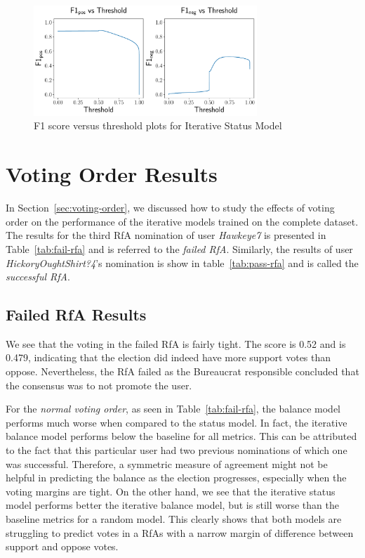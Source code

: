 \begin{figure}[htp]
    \centering
    \includegraphics[width=0.75\textwidth]{images/iterative_Status_f1.pdf}
    \caption{F1 score versus threshold plots for Iterative Status Model}
    \label{fig:complete-iterative-status-f1}
\end{figure}


\section{Voting Order Results}
\label{sec:voting-order-results}
In Section~\ref{sec:voting-order}, we discussed how to study the effects of voting order on the performance of the iterative models trained on the complete \wikirfa dataset.
The results for the third RfA nomination  of user \textit{Hawkeye7} is presented in Table~\ref{tab:fail-rfa} and is referred to the \textit{failed RfA}.
Similarly, the results of user \textit{HickoryOughtShirt?4}'s nomination is show in table~\ref{tab:pass-rfa} and is called the \textit{successful RfA}.

\subsection{Failed RfA Results}
We see that the voting in the failed RfA is fairly tight.
The \aucposPR score is 0.52 and \aucnegPR is 0.479, indicating that the election did indeed have more support votes than oppose.
Nevertheless, the RfA failed as the Bureaucrat responsible concluded that the consensus was to not promote the user.

For the \textit{normal voting order}, as seen in Table~\ref{tab:fail-rfa}, the balance model performs much worse when compared to the status model.
In fact, the iterative balance model performs below the baseline for all metrics.
This can be attributed to the fact that this particular user had two previous nominations of which one was successful.
Therefore, a symmetric measure of agreement might not be helpful in predicting the balance as the election progresses, especially when the voting margins are tight.
On the other hand, we see that the iterative status model performs better the iterative balance model, but is still worse than the baseline metrics for a random model.
This clearly shows that both models are struggling to predict votes in a RfAs with a narrow margin of difference between support and oppose votes.  

